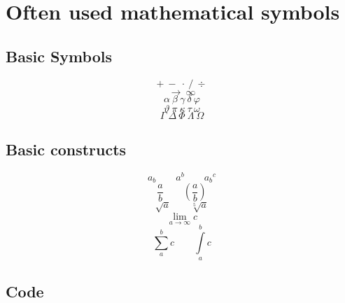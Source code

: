 \section{Often used mathematical symbols}

\subsection{Basic Symbols}
\[ + ~ - ~ \cdot ~ / ~ \div \]
\[ \to ~ \infty \]
\[ \alpha ~ \beta ~ \gamma ~ \delta ~ \varphi \]
\[ \vartheta ~ \pi ~ \kappa ~ \tau ~ \omega \]
\[ \Gamma ~ \Delta ~ \Phi ~ \Lambda ~ \Omega \]

\subsection{Basic constructs}
\[ a_{b} \qquad a^{b} \qquad {a_{b}}^{c} \]
\[ \frac{a}{b} \qquad \left( \frac{a}{b} \right) \]
\[ \sqrt{a} \qquad \sqrt[5]{a} \]
\[ \lim\limits_{a \to \infty} c \]
\[ \sum\limits_{a}^{b}c \qquad \int\limits_{a}^{b}c \]

\subsection{Code}

